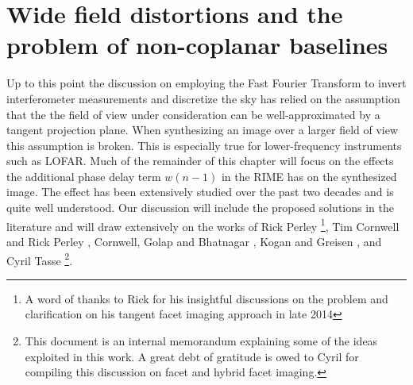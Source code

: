 \section{Wide field distortions and the problem of non-coplanar baselines}
Up to this point the discussion on employing the Fast Fourier Transform to invert interferometer measurements and discretize the sky has relied on the assumption
that the the field of view under consideration can be well-approximated by a tangent projection plane. When synthesizing an image over a larger field of view
this assumption is broken. This is especially true for lower-frequency instruments such as LOFAR. Much of the remainder of this 
chapter will focus on the effects the additional phase delay term $w(n-1)$ in the RIME has on the synthesized image. The effect has been extensively studied over 
the past two decades and is quite well understood. Our discussion will include the proposed solutions in the literature and will draw extensively on the works of 
Rick Perley \cite[Lecture 19]{taylor1999synthesis}\footnote{A word of thanks to Rick for his insightful discussions on the problem and clarification on his 
tangent facet imaging approach in late 2014}, Tim Cornwell and 
Rick Perley \cite{cornwell1992radio}, Cornwell, Golap and Bhatnagar \cite{cornwell2008noncoplanar}, Kogan and Greisen \cite{aipsfaceting}, and 
Cyril Tasse \cite{tassefaceting}\footnote{This document is an internal memorandum explaining some of the ideas exploited in this work. A great debt of gratitude 
is owed to Cyril for compiling this discussion on facet and hybrid facet imaging.}.

